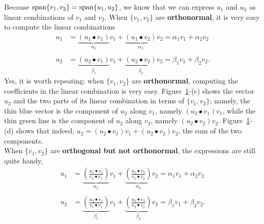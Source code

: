 \begin{figure}[hbt!]
    \label{fig:OrthognalVectors}
\end{figure}

 Because $\mathrm{span} \{ v_1, v_2 \}= \mathrm{span} \{ u_1, u_2 \}$, we know that we can express $u_1$ and $u_2$ as linear combinations of $v_1$ and $v_2$. When $\{v_1, v_2 \}$ are \textbf{orthonormal}, it is very easy to compute the linear combinations
$$
\begin{aligned}
u_1 & =   \underbrace{\left(u_1 \bullet v_1 \right)}_{\alpha_1} v_1 +  \underbrace{\left(u_1 \bullet v_2 \right)}_{\alpha_2} v_2 = \alpha_1 v_1 + \alpha_2 v_2\\
\\
u_2 & =   \underbrace{\left(u_2 \bullet v_1 \right)}_{\beta_1} v_1 +  \underbrace{\left(u_2 \bullet v_2 \right)}_{\beta_2} v_2 = \beta_1 v_1 + \beta_2 v_2.
\end{aligned}
$$
Yes, it is worth repeating: when $\{v_1, v_2 \}$ are \textbf{orthonormal}, computing the coefficients in the linear combination is very easy. Figure~\ref{fig:OrthognalVectors}-(c) shows the vector $u_2$ and the two parts of its linear combination in terms of $\{v_1, v_2 \}$; namely, the thin blue vector is the component of $u_2$ along $v_1$, namely $\left(u_2 \bullet v_1 \right) v_1$, while the thin green line is the component of $u_2$ along $v_2$, namely $\left(u_2 \bullet v_2 \right) v_2$. Figure~\ref{fig:OrthognalVectors}-(d) shows that indeed, $u_2 =   \left(u_2 \bullet v_1 \right) v_1 +  \left(u_2 \bullet v_2 \right) v_2$, the sum of the two components.\\

When $\{v_1, v_2 \}$ are \textbf{orthogonal but not orthonormal}, the expressions are still quite handy,
$$
\begin{aligned}
u_1 & =   \underbrace{\left(\frac{u_1 \bullet v_1}{v_1 \bullet v_1}\right)}_{\alpha_1} v_1 +  \underbrace{\left(\frac{u_1 \bullet v_2}{v_2 \bullet v_2}\right)}_{\alpha_2} v_2 = \alpha_1 v_1 + \alpha_2 v_2\\
\\
u_2 & =   \underbrace{\left(\frac{u_2 \bullet v_1}{v_1 \bullet v_1}\right)}_{\beta_1} v_1 +  \underbrace{\left(\frac{u_2 \bullet v_2}{v_2 \bullet v_2}\right)}_{\beta_2} v_2 = \beta_1 v_1 + \beta_2 v_2.
\end{aligned}
$$

